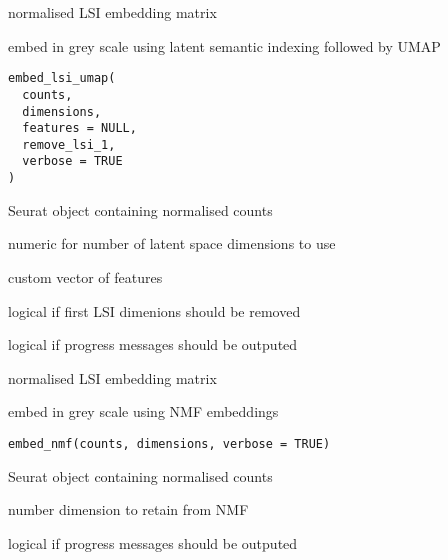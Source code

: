 \documentclass[a4paper]{book}
\begin{document}
%
\begin{Value}
normalised LSI embedding matrix
\end{Value}
%
\begin{Description}
embed in grey scale using latent semantic indexing 
followed by UMAP
\end{Description}
%
\begin{Usage}
\begin{verbatim}
embed_lsi_umap(
  counts,
  dimensions,
  features = NULL,
  remove_lsi_1,
  verbose = TRUE
)
\end{verbatim}
\end{Usage}
%
\begin{Arguments}
\begin{ldescription}
\item[\code{counts}] Seurat object containing normalised counts

\item[\code{dimensions}] numeric for number of latent space dimensions to use

\item[\code{features}] custom vector of features

\item[\code{remove\_lsi\_1}] logical if first LSI dimenions should be removed

\item[\code{verbose}] logical if progress messages should be outputed
\end{ldescription}
\end{Arguments}
%
\begin{Value}
normalised LSI embedding matrix
\end{Value}
%
\begin{Description}
embed in grey scale using NMF embeddings
\end{Description}
%
\begin{Usage}
\begin{verbatim}
embed_nmf(counts, dimensions, verbose = TRUE)
\end{verbatim}
\end{Usage}
%
\begin{Arguments}
\begin{ldescription}
\item[\code{counts}] Seurat object containing normalised counts

\item[\code{dimensions}] number dimension to retain from NMF

\item[\code{verbose}] logical if progress messages should be outputed
\end{ldescription}
\end{Arguments}
\end{document}
